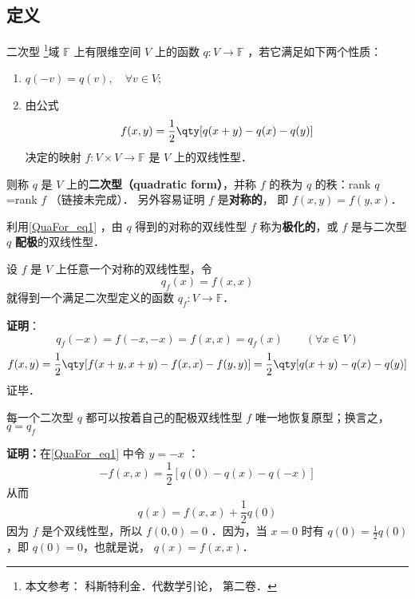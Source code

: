 
\subsection{定义}
\begin{definition}{二次型}\label{QuaFor_def2}
\footnote{本文参考： 科斯特利金．代数学引论， 第二卷．}域 $\mathbb{F}$ 上有限维空间 $V$ 上的函数 $q:V\rightarrow\mathbb{F}$ ，若它满足如下两个性质：
\begin{enumerate}
\item $q(-{v})=q( v),\quad \forall v\in V$;
\item 由公式
\begin{equation}\label{QuaFor_eq1}
f(x, y)=\frac{1}{2}\qty[q(x+ y)-q(x)-q(y)]
\end{equation}
决定的映射 $f:V\times V\rightarrow\mathbb{F}$ 是 $V$ 上的双线性型．
\end{enumerate}
则称 $q$ 是 $V$ 上的\textbf{二次型（quadratic form）}，并称 $f$ 的秩为 $q$ 的秩：rank $q$=rank $f$ （链接未完成）． 另外容易证明 $f$ 是\textbf{对称的}， 即 $f(x,y) = f(y,x)$．
\end{definition}
利用\autoref{QuaFor_eq1} ，由 $q$ 得到的对称的双线性型 $f$ 称为\textbf{极化的}，或 $f$ 是与二次型 $q$ \textbf{配极}的双线性型．
\begin{example}{}
设 $f$ 是 $V$ 上任意一个对称的双线性型，令
\begin{equation}
q_f( x)=f( x, x)
\end{equation}
就得到一个满足二次型定义的函数 $q_f:V\rightarrow\mathbb{F}$．

\textbf{证明}：
\begin{equation}
q_f(-{x})=f(-{x},-{x})=f({x},{x})=q_f({x}) \qquad (\forall x\in V)
\end{equation}
\begin{equation}
f(x, y)=\frac{1}{2}\qty[f( x+ y, x+ y)-f( x, x)-f( y, y)]
=\frac{1}{2}\qty[q(x+ y)-q(x)-q(y)]
\end{equation}
证毕．
\end{example}

\begin{theorem}{}\label{QuaFor_the1}
每一个二次型 $q$ 都可以按着自己的配极双线性型 $f$ 唯一地恢复原型；换言之， $q=q_f$
\end{theorem}
\textbf{证明：}在\autoref{QuaFor_eq1} 中令 $y=-x$ ：
\begin{equation}
-f(x,x)=\frac{1}{2}[q(0)-q(x)-q(-x)]
\end{equation}
从而
\begin{equation}
q(x)=f(x,x)+\frac{1}{2}q(0)
\end{equation}
因为 $f$ 是个双线性型，所以 $f(0,0)=0$ ．因为，当 $x=0$ 时有 $q(0)=\frac{1}{2}q(0)$ ，即 $q(0)=0$，也就是说， $q(x)=f(x,x)$．

